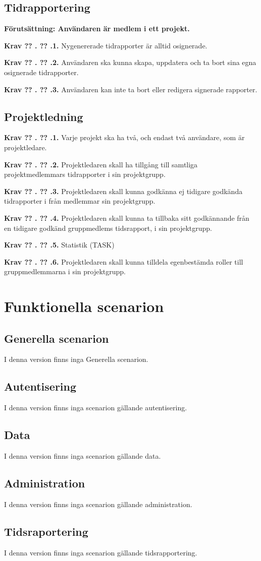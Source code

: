 \documentclass[a4paper]{article}
\newcommand\getcurrentref[1]{%
 \ifnumequal{\value{#1}}{0}
  {??}
  {\the\value{#1}}%
}
\newcommand\requirement[2]{
	\numberedrow{Krav}{#1}{#2}
}
\newcommand\numberedrow[3]{
	\noindent
	\textbf{#1 \getcurrentref{section}.\getcurrentref{subsection}.#2.} #3
	
}
\begin{document}
\subsection{Tidrapportering}
\textbf{Förutsättning: Användaren är medlem i ett projekt.}\newline
\requirement{1}{Nygenererade tidrapporter är alltid osignerade.}
\requirement{2}{Användaren ska kunna skapa, uppdatera och ta bort sina egna osignerade tidrapporter.}
\requirement{3}{Användaren kan inte ta bort eller redigera signerade rapporter.}
\subsection{Projektledning}
\requirement{1}{Varje projekt ska ha två, och endast två användare, som är projektledare.}
\requirement{2}{Projektledaren skall ha tillgång till samtliga projektmedlemmars tidrapporter i sin projektgrupp.}
\requirement{3}{Projektledaren skall kunna godkänna ej tidigare godkända tidrapporter i från medlemmar sin projektgrupp.}
\requirement{4}{Projektledaren skall kunna ta tillbaka sitt godkännande från en tidigare godkänd gruppmedlems tidsrapport, i sin projektgrupp.}
\requirement{5}{Statistik (TASK)}
\requirement{6}{Projektledaren skall kunna tilldela egenbestämda roller till gruppmedlemmarna i sin projektgrupp.}
\section{Funktionella scenarion}
\label{scenarion}
\subsection{Generella scenarion}
I denna version finns inga Generella scenarion.
\subsection{Autentisering}
I denna version finns inga scenarion gällande autentisering.
\subsection{Data}
I denna version finns inga scenarion gällande data.
\subsection{Administration}
I denna version finns inga scenarion gällande administration.
\subsection{Tidsraportering}
I denna version finns inga scenarion gällande tidsrapportering.
\end{document}
